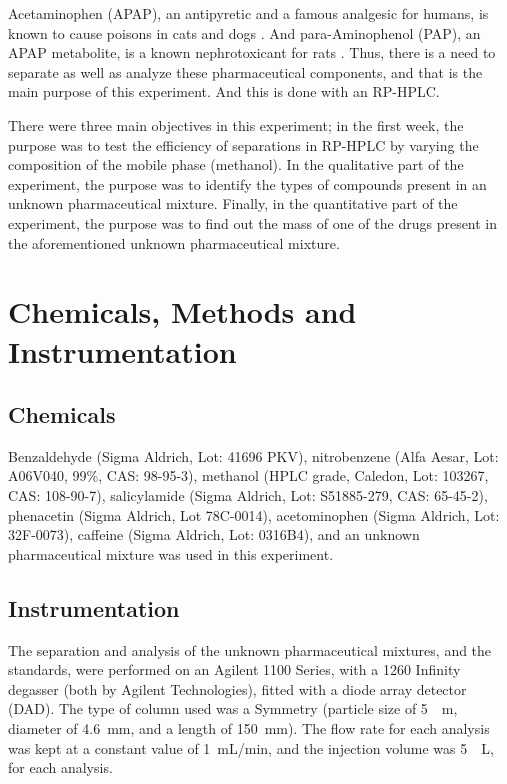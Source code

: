 \documentclass[a4paper, 12pt]{article}
\begin{document}
Acetaminophen (APAP), an antipyretic and a famous analgesic for humans, is known to cause poisons in cats and dogs \cite{dogs-cats}. And para-Aminophenol (PAP), an APAP metabolite, is a known nephrotoxicant for rats \cite{rats}. Thus, there is a need to separate as well as analyze these pharmaceutical components, and that is the main purpose of this experiment. And this is done with an RP-HPLC.

There were three main objectives in this experiment; in the first week, the purpose was to test the efficiency of separations in RP-HPLC by varying the composition of the mobile phase (methanol). In the qualitative part of the experiment, the purpose was to identify the types of compounds present in an unknown pharmaceutical mixture. Finally, in the quantitative part of the experiment, the purpose was to find out the mass of one of the drugs present in the aforementioned unknown pharmaceutical mixture.


\section{Chemicals, Methods and Instrumentation}

\subsection{Chemicals}
Benzaldehyde (Sigma Aldrich, Lot: 41696 PKV), nitrobenzene (Alfa Aesar, Lot: A06V040, 99\%, CAS: 98-95-3), methanol (HPLC grade, Caledon, Lot: 103267, CAS: 108-90-7), salicylamide (Sigma Aldrich, Lot: S51885-279, CAS: 65-45-2), phenacetin (Sigma Aldrich, Lot 78C-0014), acetominophen (Sigma Aldrich, Lot: 32F-0073), caffeine (Sigma Aldrich, Lot: 0316B4), and an unknown pharmaceutical mixture was used in this experiment.

\subsection{Instrumentation}
The separation and analysis of the unknown pharmaceutical mixtures, and the standards, were performed on an Agilent 1100 Series, with a 1260 Infinity degasser (both by Agilent Technologies), fitted with a diode array detector (DAD). The type of column used was a Symmetry\textregistered{}  (particle size of \SI{5}{\mu{}m}, diameter of \SI{4.6}{mm}, and a length of \SI{150}{mm}). The flow rate for each analysis was kept at a constant value of \SI{1}{mL/min}, and the injection volume was \SI{5}{\mu{}L}, for each analysis.
\end{document}
